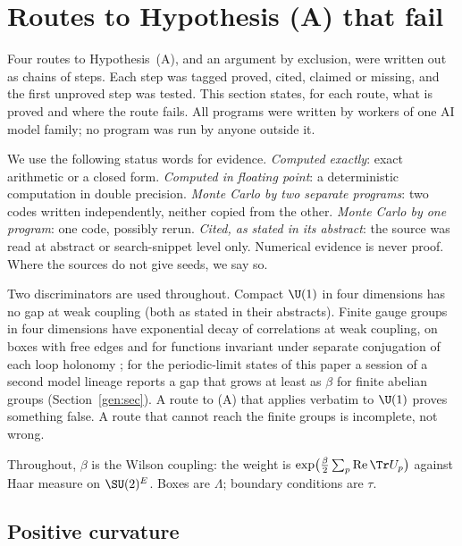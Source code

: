 
\section{Routes to Hypothesis (A) that fail}\label{sec:routes}

Four routes to Hypothesis~(A), and an argument by exclusion, were written out as chains of steps. Each step was tagged
proved, cited, claimed or missing, and the first unproved step was tested. This section
states, for each route, what is proved and where the route fails. All programs were written
by workers of one AI model family; no program was run by anyone outside it.

We use the following status words for evidence. \emph{Computed exactly}: exact arithmetic or
a closed form. \emph{Computed in floating point}: a deterministic computation in double
precision. \emph{Monte Carlo by two separate programs}: two codes written independently,
neither copied from the other. \emph{Monte Carlo by one program}: one code, possibly rerun.
\emph{Cited, as stated in its abstract}: the source was read at abstract or search-snippet
level only. Numerical evidence is never proof. Where the sources do not give seeds, we say so.

Two discriminators are used throughout. Compact $\U(1)$ in four dimensions has no gap at weak
coupling \cite{Guth80,FS82} (both as stated in their abstracts). Finite gauge groups in four
dimensions have exponential decay of correlations at weak coupling, on boxes with free edges and for
functions invariant under separate conjugation of each loop holonomy \cite[Theorem~1.1]{AC22}; for the
periodic-limit states of this paper a session of a second model lineage reports a gap that grows at least
as $\beta$ for finite abelian groups (Section~\ref{gen:sec}). A route to (A)
that applies verbatim to $\U(1)$ proves something false. A route that cannot reach the finite
groups is incomplete, not wrong.

Throughout, $\beta$ is the Wilson coupling: the weight is
$\exp\bigl(\tfrac{\beta}{2}\sum_p \operatorname{Re}\Tr U_p\bigr)$ against Haar measure on
$\SU(2)^E$. Boxes are $\Lambda$; boundary conditions are $\tau$.

\subsection{Positive curvature}\label{neg:sub-curv}

